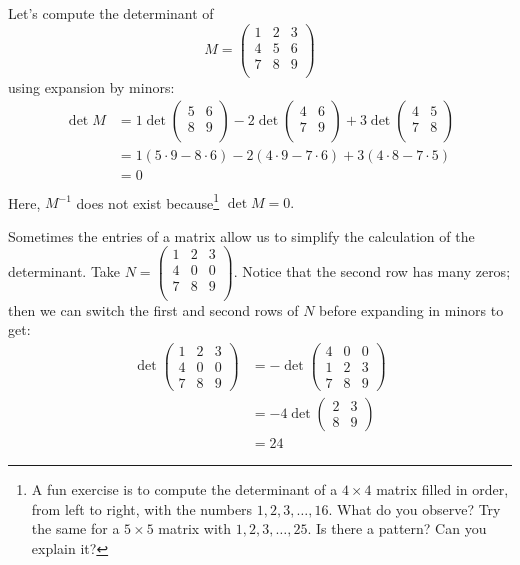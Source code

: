 \begin{example}
Let's compute the determinant of 
\[M=\begin{pmatrix}
1 & 2 & 3 \\
4 & 5 & 6 \\
7 & 8 & 9 \\
\end{pmatrix}\] using expansion by minors:
\begin{align*}
\det M & = 1\det \begin{pmatrix}
5 & 6 \\
8 & 9 \\
\end{pmatrix}
-2 \det \begin{pmatrix}
4 & 6 \\
7 & 9 \\
\end{pmatrix}
+3 \det \begin{pmatrix}
4 & 5 \\
7 & 8 \\
\end{pmatrix} \\
& = 1(5\cdot 9- 8\cdot 6) -2 (4\cdot 9- 7\cdot 6) + 3 (4\cdot 8- 7\cdot 5) \\[1mm]
& = 0 \\
\end{align*}
Here, $M^{-1}$ does not exist because\footnote{A fun exercise is to compute the determinant of a $4\times 4$ matrix filled in order, from left to right,  with the numbers $1,2,3,\ldots, 16$. What do you observe? Try the same for a $5\times 5$ matrix with $1,2,3,\ldots, 25$. Is there a pattern? Can you explain it?} $\det M=0.$
\end{example}


\begin{example}
Sometimes the entries of a matrix allow us to simplify the calculation of the determinant.  Take $N= \begin{pmatrix}
1 & 2 & 3 \\
4 & 0 & 0 \\
7 & 8 & 9 \\
\end{pmatrix}$.  Notice that the second row has many zeros; then we can switch the first and second rows of $N$ before expanding in minors to get:
\begin{align*}
\det \begin{pmatrix}
1 & 2 & 3 \\
4 & 0 & 0 \\
7 & 8 & 9 
\end{pmatrix}
& = -\det \begin{pmatrix}
4 & 0 & 0 \\
1 & 2 & 3 \\
7 & 8 & 9
\end{pmatrix}\\
&= -4 \det \begin{pmatrix}
2 & 3 \\
8 & 9 
\end{pmatrix} \\
&= 24
\end{align*}
\end{example}
 
